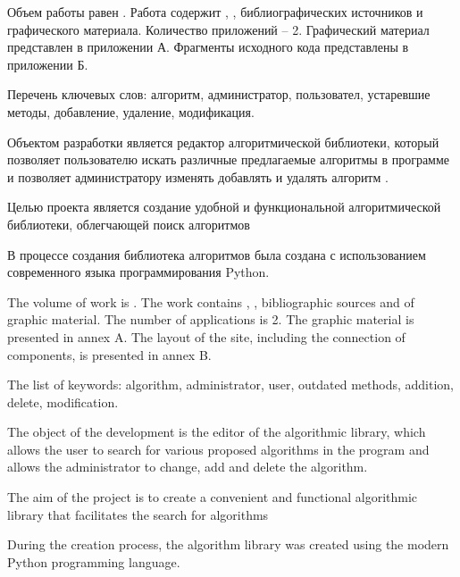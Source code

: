 
Объем работы равен . Работа содержит , ,  библиографических источников и  графического материала. Количество приложений – 2. Графический материал представлен в приложении А. Фрагменты исходного кода представлены в приложении Б.

Перечень ключевых слов: алгоритм, администратор, пользовател, устаревшие методы, добавление, удаление, модификация.

Объектом разработки является редактор алгоритмической библиотеки, который позволяет пользователю искать различные предлагаемые алгоритмы в программе и позволяет администратору изменять добавлять и удалять алгоритм .

Целью проекта является создание удобной и функциональной алгоритмической библиотеки, облегчающей поиск алгоритмов

В процессе создания библиотека алгоритмов была создана с использованием современного языка программирования Python.


The volume of work is . The work contains , ,  bibliographic sources and  of graphic material. The number of applications is 2. The graphic material is presented in annex A. The layout of the site, including the connection of components, is presented in annex B.

The list of keywords: algorithm, administrator, user, outdated methods, addition, delete, modification.

The object of the development is the editor of the algorithmic library, which allows the user to search for various proposed algorithms in the program and allows the administrator to change, add and delete the algorithm.

The aim of the project is to create a convenient and functional algorithmic library that facilitates the search for algorithms

During the creation process, the algorithm library was created using the modern Python programming language.
